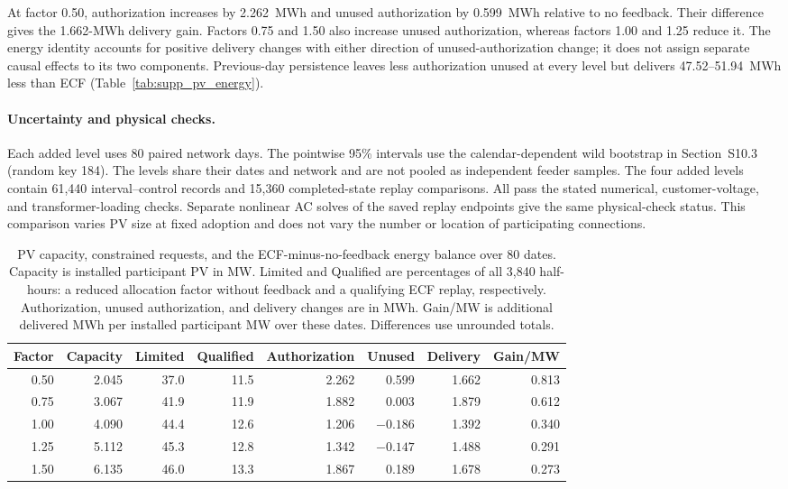 \documentclass[11pt]{article}
\begin{document}
At factor 0.50, authorization increases by 2.262~MWh and unused authorization
by 0.599~MWh relative to no feedback. Their difference gives the 1.662-MWh
delivery gain. Factors 0.75 and 1.50 also increase unused authorization,
whereas factors 1.00 and 1.25 reduce it. The energy identity accounts for
positive delivery changes with either direction of unused-authorization change;
it does not assign separate causal effects to its two components.
Previous-day persistence leaves less authorization unused at every level but
delivers 47.52--51.94~MWh less than ECF
(Table~\ref{tab:supp_pv_energy}).

\paragraph{Uncertainty and physical checks.}
Each added level uses 80 paired network days. The pointwise 95\% intervals
use the calendar-dependent wild bootstrap in Section~S10.3 (random key 184).
The levels share their dates and network and are not pooled as independent
feeder samples. The four added levels contain 61,440 interval--control records
and 15,360 completed-state replay comparisons. All pass the stated numerical,
customer-voltage, and transformer-loading checks. Separate nonlinear AC solves
of the saved replay endpoints give the same physical-check status.
This comparison varies PV size at fixed adoption and does not vary the
number or location of participating connections.

\begin{table}[!htbp]
\centering
\caption{PV capacity, constrained requests, and the ECF-minus-no-feedback
energy balance over 80 dates. Capacity is installed participant PV in MW.
Limited and Qualified are percentages of all 3,840 half-hours: a reduced
allocation factor without feedback and a qualifying ECF replay, respectively.
Authorization, unused authorization, and delivery changes are in MWh.
Gain/MW is additional delivered MWh per installed participant MW over these
dates. Differences use unrounded totals.}
\label{tab:supp_pv_scale}
\small
\begin{tabular}{@{}rrrrrrrr@{}}
\toprule
Factor & Capacity & Limited & Qualified & Authorization & Unused & Delivery & Gain/MW \\
\midrule
0.50 & 2.045 & 37.0 & 11.5 & 2.262 & 0.599 & 1.662 & 0.813 \\
0.75 & 3.067 & 41.9 & 11.9 & 1.882 & 0.003 & 1.879 & 0.612 \\
1.00 & 4.090 & 44.4 & 12.6 & 1.206 & $-0.186$ & 1.392 & 0.340 \\
1.25 & 5.112 & 45.3 & 12.8 & 1.342 & $-0.147$ & 1.488 & 0.291 \\
1.50 & 6.135 & 46.0 & 13.3 & 1.867 & 0.189 & 1.678 & 0.273 \\
\bottomrule
\end{tabular}
\end{table}
\end{document}
